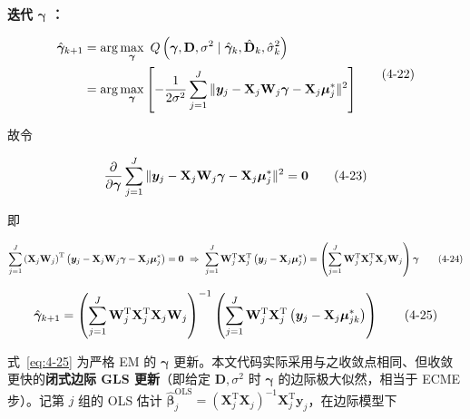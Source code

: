 \documentclass[12pt,a4paper]{ctexart}
\makeatletter
\numberwithin{figure}{section}
\numberwithin{table}{section}
\let\ltx@orig@tag\tag
\renewcommand{\tag}[1]{\refstepcounter{equation}\ltx@orig@tag{#1}}%
\makeatother
\begin{document}
\textbf{迭代 $\boldsymbol{\gamma}$ ：}

\begin{equation}
\begin{aligned}
\hat{\boldsymbol{\gamma}}_{k+1}&=\arg\max_{\boldsymbol{\gamma}}\ Q\left(\boldsymbol{\gamma},\mathbf{D},\sigma^{2}\mid\hat{\boldsymbol{\gamma}}_{k},\hat{\mathbf{D}}_{k},\hat{\sigma}_{k}^{2}\right)\\
&=\arg\max_{\boldsymbol{\gamma}}\left[-\frac{1}{2\sigma^{2}}\sum_{j=1}^{J}\|\boldsymbol{y}_{j}-\mathbf{X}_{j}\mathbf{W}_{j}\boldsymbol{\gamma}-\mathbf{X}_{j}\boldsymbol{\mu}_{j}^{*}\|^{2}\right]
\end{aligned} \tag{4-22}
\end{equation}

故令

\begin{equation}
\frac{\partial}{\partial\boldsymbol{\gamma}}\sum_{j=1}^{J}\|\boldsymbol{y}_{j}-\mathbf{X}_{j}\mathbf{W}_{j}\boldsymbol{\gamma}-\mathbf{X}_{j}\boldsymbol{\mu}_{j}^{*}\|^{2}=\mathbf{0} \tag{4-23}
\end{equation}

即

\begin{equation}
\sum_{j=1}^{J}\left(\mathbf{X}_{j}\mathbf{W}_{j}\right)^{\mathrm{T}}\left(\boldsymbol{y}_{j}-\mathbf{X}_{j}\mathbf{W}_{j}\boldsymbol{\gamma}-\mathbf{X}_{j}\boldsymbol{\mu}_{j}^{*}\right)=\mathbf{0}\ \Rightarrow\ \sum_{j=1}^{J}\mathbf{W}_{j}^{\mathrm{T}}\mathbf{X}_{j}^{\mathrm{T}}\left(\boldsymbol{y}_{j}-\mathbf{X}_{j}\boldsymbol{\mu}_{j}^{*}\right)=\left(\sum_{j=1}^{J}\mathbf{W}_{j}^{\mathrm{T}}\mathbf{X}_{j}^{\mathrm{T}}\mathbf{X}_{j}\mathbf{W}_{j}\right)\boldsymbol{\gamma} \tag{4-24}
\end{equation}

\begin{equation}
\hat{\boldsymbol{\gamma}}_{k+1}=\left(\sum_{j=1}^{J}\mathbf{W}_{j}^{\mathrm{T}}\mathbf{X}_{j}^{\mathrm{T}}\mathbf{X}_{j}\mathbf{W}_{j}\right)^{-1}\left(\sum_{j=1}^{J}\mathbf{W}_{j}^{\mathrm{T}}\mathbf{X}_{j}^{\mathrm{T}}\left(\boldsymbol{y}_{j}-\mathbf{X}_{j}\boldsymbol{\mu}_{jk}^{*}\right)\right) \tag{4-25}\label{eq:4-25}
\end{equation}

式~\eqref{eq:4-25} 为严格 EM 的 $\boldsymbol{\gamma}$ 更新。本文代码实际采用与之收敛点相同、但收敛更快的\textbf{闭式边际 GLS 更新}（即给定 $\mathbf{D},\sigma^{2}$ 时 $\boldsymbol{\gamma}$ 的边际极大似然，相当于 ECME 步）。记第 $j$ 组的 OLS 估计 $\hat{\boldsymbol{\beta}}_{j}^{\mathrm{OLS}}=\left(\mathbf{X}_{j}^{\mathrm{T}}\mathbf{X}_{j}\right)^{-1}\mathbf{X}_{j}^{\mathrm{T}}\boldsymbol{y}_{j}$，在边际模型下
\end{document}
